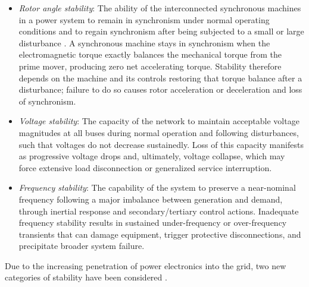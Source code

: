 \begin{itemize}
    \item \textit{Rotor angle stability}: The ability of the interconnected synchronous machines in a power system 
    to remain in synchronism under normal operating conditions and to regain synchronism after being subjected to a
     small or large disturbance \cite{StabilityAndControlKundur}. A synchronous machine stays in synchronism when the 
     electromagnetic torque exactly balances the mechanical torque from the prime mover, producing zero net accelerating torque. 
     Stability therefore depends on the machine and its controls restoring that torque balance after a disturbance; failure to do 
     so causes rotor acceleration or deceleration and loss of synchronism.
    \item \textit{Voltage stability}: The capacity of the network to maintain acceptable voltage magnitudes at all buses 
    during normal operation and following disturbances, such that voltages do not decrease sustainedly. Loss of this 
    capacity manifests as progressive voltage drops and, ultimately, voltage collapse, which may force extensive load disconnection 
    or generalized service interruption.
    \item \textit{Frequency stability}: The capability of the system to preserve a near-nominal frequency following a major 
    imbalance between generation and demand, through inertial response and secondary/tertiary control actions. Inadequate frequency 
    stability results in sustained under-frequency or over-frequency transients that can damage equipment, trigger protective disconnections, 
    and precipitate broader system failure.
\end{itemize}

Due to the increasing penetration of power electronics into the grid, two new categories of stability have been considered \cite{DefStabExtended}.

